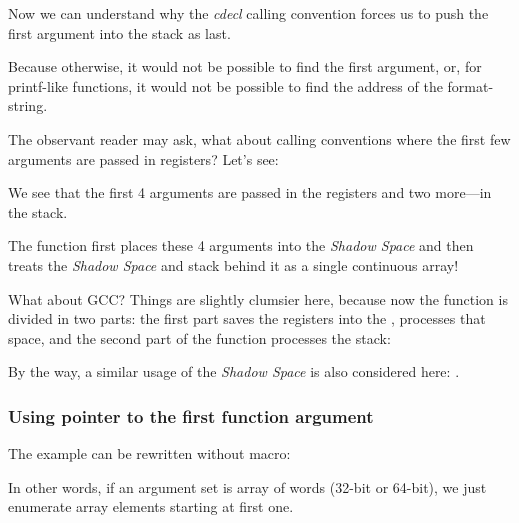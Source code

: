 Now we can understand why the \emph{cdecl} calling convention forces us to push the first argument 
into the stack as last.

Because otherwise, it would not be possible to find the first argument, 
or, for printf-like functions, it would not be possible to find the address of the format-string.

\label{variadic_arith_registers}

The observant reader may ask, what about calling conventions where the first few arguments are passed in registers?
Let's see:



We see that the first 4 arguments are passed in the registers and two more---in the stack.

The  function first places these 4 arguments into the \emph{Shadow Space} and then treats
the \emph{Shadow Space} and stack behind it as a single continuous array!

What about GCC? Things are slightly clumsier here, because now the function is divided in two parts:
the first part saves the registers into the , processes that space, and the second part of the function processes 
the stack:



By the way, a similar usage of the \emph{Shadow Space} is also considered here: .

\subsubsection{Using pointer to the first function argument}

The example can be rewritten without  macro:



In other words, if an argument set is array of words (32-bit or 64-bit), we just enumerate array elements starting
at first one.

